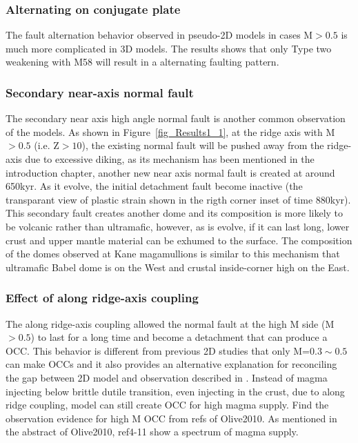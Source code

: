 \subsubsection{Alternating on conjugate plate}

The fault alternation behavior observed in pseudo-2D models in cases M$>0.5$ is much more complicated in 3D models. The results shows that only Type two weakening with M58 will result in a alternating faulting pattern. 

\subsubsection{Secondary near-axis normal fault}

The secondary near axis high angle normal fault is another common observation of the models. As shown in Figure~\ref{fig_Results1_1}, at the ridge axis with M$>0.5$ (i.e. Z$>10$), the existing normal fault will be pushed away from the ridge-axis due to excessive diking, as its mechanism has been mentioned in the introduction chapter, another new near axis normal fault is created at around 650kyr. As it evolve, the initial detachment fault become inactive (the transparant view of plastic strain shown in the rigth corner inset of time 880kyr). This secondary fault creates another dome and its composition is more likely to be volcanic rather than ultramafic, however, as is evolve, if it can last long, lower crust and upper mantle material can be exhumed to the surface. The composition of the domes observed at Kane magamullions is similar to this mechanism that ultramafic Babel dome is on the West and crustal inside-corner high on the East.    

\subsubsection{Effect of along ridge-axis coupling}
The along ridge-axis coupling allowed the normal fault at the high M side (M$>0.5$) to last for a long time and become a detachment that can produce a OCC. This behavior is different from previous 2D studies that only M=$0.3\sim0.5$ can make OCCs and it also provides an alternative explanation for reconciling the gap between 2D model and observation described in \citep{Olive2010}. Instead of magma injecting below brittle dutile transition, even injecting in the crust, due to along ridge coupling, model can still create OCC for high magma supply. Find the observation evidence for high M OCC from refs of Olive2010. As mentioned in the abstract of Olive2010, ref4-11 show a spectrum of magma supply.

